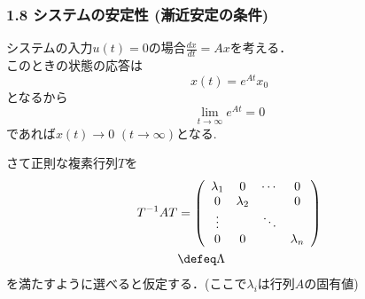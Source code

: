 \begin{frame}[t]
\frametitle{1.8 システムの安定性 (漸近安定の条件)}

システムの入力$u(t)=0$の場合$\frac{dx}{dt} = Ax$を考える．\\
このときの状態の応答は
\begin{equation}
 x(t) = e^{At} x_0
\end{equation}
となるから
\begin{equation}
 \lim_{t \rightarrow \infty} e^{At} = 0
\end{equation}
であれば$x(t) \rightarrow 0$ $(t \rightarrow \infty)$となる.

さて正則な複素行列$T$を
\begin{align}
 T^{-1} A T
  &=
  \left(\begin{array}{cccc}
         \lambda_1 & 0         & \cdots & 0 \\
   0         & \lambda_2 &        & 0 \\
   \vdots    &           & \ddots & \\
   0         & 0         &        & \lambda_n
  \end{array}\right) \nonumber \\
 &\defeq \Lambda
\end{align}
を満たすように選べると仮定する．(ここで$\lambda_i$は行列$A$の固有値)
\end{frame}


